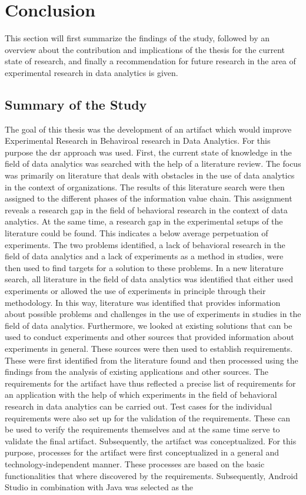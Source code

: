 \newpage\section{Conclusion}

This section will first summarize the findings of the study, followed by an overview about the contribution and implications of the thesis for the current state of research, and finally a recommendation for future research in the area of experimental research in data analytics is given. 

\subsection{Summary of the Study}

The goal of this thesis was the development of an artifact which would improve Experimental Research in Behaviroal research in Data Analytics. For this purpose the \ac{dsr} approach was used. First, the current state of knowledge in the field of data analytics was searched with the help of a literature review. The focus was primarily on literature that deals with obstacles in the use of data analytics in the context of organizations. The results of this literature search were then assigned to the different phases of the information value chain. This assignment reveals a research gap in the field of behavioral research in the context of data analytics. At the same time, a research gap in the experimental setups of the literature could be found. This indicates a below average perpetuation of experiments. The two problems identified, a lack of behavioral research in the field of data analytics and a lack of experiments as a method in studies, were then used to find targets for a solution to these problems. In a new literature search, all literature in the field of data analytics was identified that either used experiments or allowed the use of experiments in principle through their methodology. In this way, literature was identified that provides information about possible problems and challenges in the use of experiments in studies in the field of data analytics. Furthermore, we looked at existing solutions that can be used to conduct experiments and other sources that provided information about experiments in general. These sources were then used to establish requirements. These were first identified from the literature found and then processed using the findings from the analysis of existing applications and other sources. The requirements for the artifact have thus reflected a precise list of requirements for an application with the help of which experiments in the field of behavioral research in data analytics can be carried out. Test cases for the individual requirements were also set up for the validation of the requirements. These can be used to verify the requirements themselves and at the same time serve to validate the final artifact. Subsequently, the artifact was conceptualized. For this purpose, processes for the artifact were first conceptualized in a general and technology-independent manner. These processes are based on the basic functionalities that where discovered by the requirements. Subsequently, Android Studio in combination with Java was selected as the 